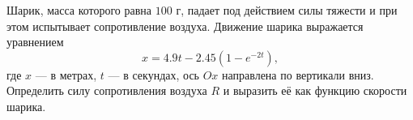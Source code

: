 Шарик, масса которого равна $100$ г, падает под действием силы тяжести
и при этом испытывает сопротивление воздуха.
Движение шарика выражается уравнением
$$x = 4.9t - 2.45(1 -e^{-2t}),$$
где $x$ --- в метрах, $t$ --- в секундах,
ось $Ox$ направлена по вертикали вниз.
Определить силу сопротивления воздуха $R$
и выразить её как функцию скорости шарика.
